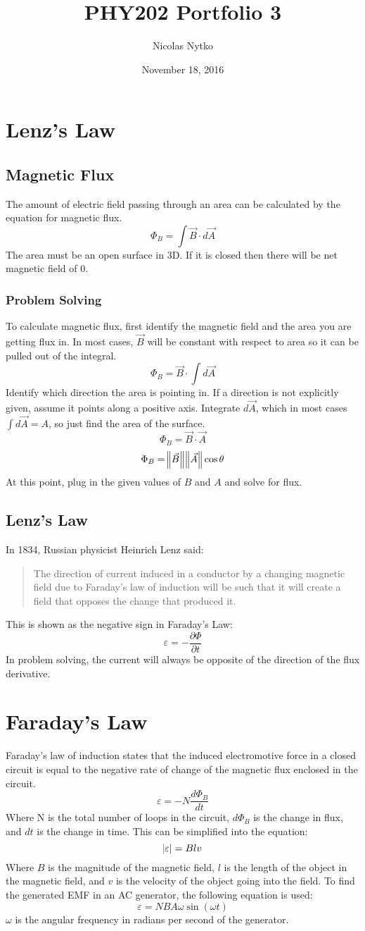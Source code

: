 \documentclass{article}
\title{PHY202 Portfolio 3}
\author{Nicolas Nytko}
\date{November 18, 2016}
\begin{document}
\maketitle
\newpage
\section{Lenz's Law}
\subsection{Magnetic Flux}
The amount of electric field passing through an area can be calculated by the equation for magnetic flux.
\[ \Phi_B = \int \vec{B} \cdot d\vec{A} \]
The area must be an open surface in 3D.  If it is closed then there will be net magnetic field of 0.
\subsubsection{Problem Solving}
To calculate magnetic flux, first identify the magnetic field and the area you are getting flux in.  In most cases, $\vec{B}$ will be constant with respect to area so it can be pulled out of the integral.
\[ \Phi_B = \vec{B} \cdot \int d\vec{A} \]
Identify which direction the area is pointing in.  If a direction is not explicitly given, assume it points along a positive axis.  Integrate $d\vec{A}$, which in most cases $\int d\vec{A} = A$, so just find the area of the surface.
\[ \Phi_B = \vec{B} \cdot \vec{A} \]
\[ \Phi_B = \norm{\vec{B}} \norm{\vec{A}} \cos \theta \]
At this point, plug in the given values of $B$ and $A$ and solve for flux.
\subsection{Lenz's Law}
In 1834, Russian physicist Heinrich Lenz said:
\begin{quote}
{The direction of current induced in a conductor by a changing magnetic field due to Faraday's law of induction will be such that it will create a field that opposes the change that produced it.}
\end{quote}
This is shown as the negative sign in Faraday's Law:
\[ \varepsilon = -\frac{\partial \Phi}{\partial t} \]
In problem solving, the current will always be opposite of the direction of the flux derivative.
\section{Faraday's Law}
Faraday's law of induction states that the induced electromotive force in a closed circuit is equal to the negative rate of change of the magnetic flux enclosed in the circuit.
\[ \varepsilon = -N\frac{d\Phi_B}{dt} \]
Where N is the total number of loops in the circuit, $d\Phi_B$ is the change in flux, and $dt$ is the change in time.  This can be simplified into the equation:
\[ \abs{\varepsilon} = Blv \]
Where $B$ is the magnitude of the magnetic field, $l$ is the length of the object in the magnetic field, and $v$ is the velocity of the object going into the field.
To find the generated EMF in an AC generator, the following equation is used:
\[ \varepsilon = NBA\omega\sin(\omega t) \]
$\omega$ is the angular frequency in radians per second of the generator.
\end{document}
